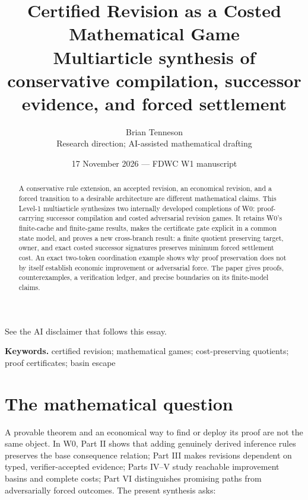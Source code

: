 \documentclass[11pt,letterpaper]{article}
\theoremstyle{definition}
\theoremstyle{remark}
\begin{document}
\newcommand{\leveltag}{W1}
\title{\bfseries\LARGE Certified Revision as a Costed Mathematical Game\\[0.45em]\large Multiarticle synthesis of conservative compilation, successor evidence, and forced settlement}
\author{Brian Tenneson\\\normalsize Research direction; AI-assisted mathematical drafting}
\date{17 November 2026 --- FDWC W1 manuscript}
\maketitle
\begin{center}\small See the AI disclaimer that follows this essay.\end{center}
\begin{abstract}A conservative rule extension, an accepted revision, an economical revision, and a forced transition to a desirable architecture are different mathematical claims. This Level-1 multiarticle synthesizes two internally developed completions of W0: proof-carrying successor compilation and costed adversarial revision games. It retains W0's finite-cache and finite-game results, makes the certificate gate explicit in a common state model, and proves a new cross-branch result: a finite quotient preserving target, owner, and exact costed successor signatures preserves minimum forced settlement cost. An exact two-token coordination example shows why proof preservation does not by itself establish economic improvement or adversarial force. The paper gives proofs, counterexamples, a verification ledger, and precise boundaries on its finite-model claims.\end{abstract}
\noindent\textbf{Keywords.} certified revision; mathematical games; cost-preserving quotients; proof certificates; basin escape
\tableofcontents
\newpage

\section{The mathematical question}
A provable theorem and an economical way to find or deploy its proof are not the same object. In W0, Part II shows that adding genuinely derived inference rules preserves the base consequence relation; Part III makes revisions dependent on typed, verifier-accepted evidence; Parts IV--V study reachable improvement basins and complete costs; Part VI distinguishes promising paths from adversarially forced outcomes. The present synthesis asks:
\end{document}
